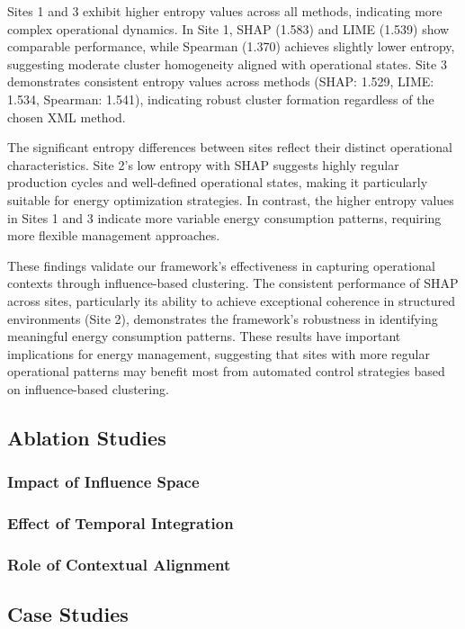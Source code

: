 \documentclass[final,5p,times,twocolumn,numbers]{elsarticle}
\begin{document}
Sites 1 and 3 exhibit higher entropy values across all methods, indicating more complex operational dynamics. In Site 1, SHAP (1.583) and LIME (1.539) show comparable performance, while Spearman (1.370) achieves slightly lower entropy, suggesting moderate cluster homogeneity aligned with operational states. Site 3 demonstrates consistent entropy values across methods (SHAP: 1.529, LIME: 1.534, Spearman: 1.541), indicating robust cluster formation regardless of the chosen XML method.

The significant entropy differences between sites reflect their distinct operational characteristics. Site 2's low entropy with SHAP suggests highly regular production cycles and well-defined operational states, making it particularly suitable for energy optimization strategies. In contrast, the higher entropy values in Sites 1 and 3 indicate more variable energy consumption patterns, requiring more flexible management approaches.

These findings validate our framework's effectiveness in capturing operational contexts through influence-based clustering. The consistent performance of SHAP across sites, particularly its ability to achieve exceptional coherence in structured environments (Site 2), demonstrates the framework's robustness in identifying meaningful energy consumption patterns. These results have important implications for energy management, suggesting that sites with more regular operational patterns may benefit most from automated control strategies based on influence-based clustering.
\subsection{Ablation Studies}
\subsubsection{Impact of Influence Space}
\subsubsection{Effect of Temporal Integration}
\subsubsection{Role of Contextual Alignment}

\subsection{Case Studies}
\end{document}
